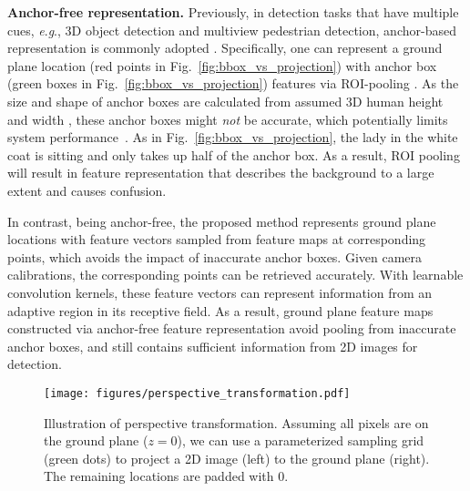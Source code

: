 \documentclass[runningheads]{llncs}
\newcommand{\eg}{\textit{e}.\textit{g}.}
\begin{document}
\textbf{Anchor-free representation.} 
Previously, in detection tasks that have multiple cues, \eg, 3D object detection and multiview pedestrian detection, anchor-based representation is commonly adopted \cite{chen2017multi,ku2018joint,chavdarova2017deep,baque2017deep}. 
Specifically, one can represent a ground plane location (red points in Fig.~\ref{fig:bbox_vs_projection}) with anchor box (green boxes in Fig.~\ref{fig:bbox_vs_projection}) features via ROI-pooling \cite{girshick2015fast}. As the size and shape of anchor boxes are calculated from assumed 3D human height and width \cite{chavdarova2017deep,baque2017deep}, 
these anchor boxes might \textit{not} be accurate, which potentially limits system performance~\cite{zhu2019feature,kong2019foveabox,yang2018metaanchor}. As in Fig.~\ref{fig:bbox_vs_projection}, the lady in the white coat is sitting and only takes up half of the anchor box. As a result, ROI pooling will result in feature representation that describes the background to a large extent and causes confusion. 

In contrast, being anchor-free, the proposed method represents ground plane locations with feature vectors sampled from feature maps at corresponding points, which avoids the impact of inaccurate anchor boxes. Given camera calibrations, the corresponding points can be retrieved accurately. 
With learnable convolution kernels, these feature vectors can represent information from an adaptive region in its receptive field. 
As a result, ground plane feature maps constructed via anchor-free feature representation avoid pooling from inaccurate anchor boxes, and still contains sufficient information from 2D images for detection.



\begin{figure}[t]
    \centering
    \texttt{[image: figures/perspective\_transformation.pdf]}
    \caption{Illustration of perspective transformation. Assuming all pixels are on the ground plane ($z=0$), we can use a parameterized sampling grid (green dots) to project a 2D image (left) to the ground plane (right). The remaining locations are padded with $0$.
}
    \label{fig:perspective_trans}
\end{figure}
\end{document}
